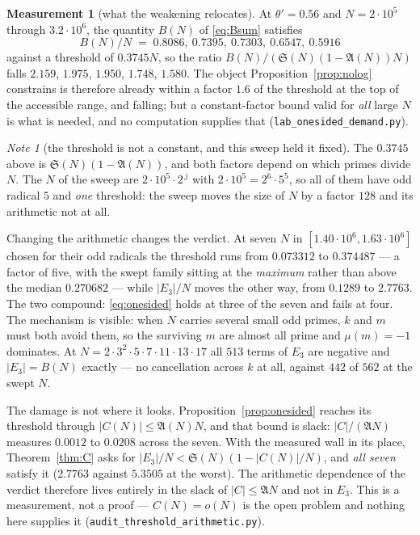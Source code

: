 \documentclass[11pt,a4paper]{article}
\theoremstyle{plain}
\theoremstyle{definition}
\newtheorem{measurement}[theorem]{Measurement}
\theoremstyle{remark}
\newtheorem{note}[theorem]{Note}
\renewcommand{\SS}{\mathfrak{S}}
\newcommand{\AAA}{\mathfrak{A}}
\begin{document}
\begin{measurement}[what the weakening relocates]\label{meas:relocate}
At $\theta'=0.56$ and $N=2\cdot10^5$ through $3.2\cdot10^6$, the
quantity $B(N)$ of \eqref{eq:Bsum} satisfies
\[
  B(N)/N\;=\;0.8086,\ 0.7395,\ 0.7303,\ 0.6547,\ 0.5916
\]
against a threshold of $0.3745N$, so the ratio
$B(N)/(\SS(N)(1-\AAA(N))N)$ falls
$2.159$, $1.975$, $1.950$, $1.748$, $1.580$. The object
Proposition~\ref{prop:nolog} constrains is therefore already within a
factor $1.6$ of the threshold at the top of the accessible range, and
falling; but a constant-factor bound valid for \emph{all} large $N$ is
what is needed, and no computation supplies that
(\texttt{lab\_onesided\_demand.py}).
\end{measurement}

\begin{note}[the threshold is not a constant, and this sweep held it
fixed]\label{note:threshfam}
The $0.3745$ above is $\SS(N)(1-\AAA(N))$, and both factors depend on
which primes divide $N$. The $N$ of the sweep are
$2\cdot10^5\cdot2^{\,j}$ with $2\cdot10^5=2^6\cdot5^5$, so all of them
have odd radical $5$ and \emph{one} threshold: the sweep moves the size
of $N$ by a factor $128$ and its arithmetic not at all.

Changing the arithmetic changes the verdict. At seven $N$ in
$[1.40\cdot10^6,1.63\cdot10^6]$ chosen for their odd radicals the
threshold runs from $0.073312$ to $0.374487$ --- a factor of five, with
the swept family sitting at the \emph{maximum} rather than above the
median $0.270682$ --- while $|E_3|/N$ moves the other way, from
$0.1289$ to $2.7763$. The two compound: \eqref{eq:onesided} holds at
three of the seven and fails at four. The mechanism is visible: when
$N$ carries several small odd primes, $k$ and $m$ must both avoid them,
so the surviving $m$ are almost all prime and $\mu(m)=-1$ dominates. At
$N=2\cdot3^2\cdot5\cdot7\cdot11\cdot13\cdot17$ all $513$ terms of $E_3$
are negative and $|E_3|=B(N)$ exactly --- no cancellation across $k$ at
all, against $442$ of $562$ at the swept $N$.

The damage is not where it looks. Proposition~\ref{prop:onesided}
reaches its threshold through $|C(N)|\le\AAA(N)N$, and that bound is
slack: $|C|/(\AAA N)$ measures $0.0012$ to $0.0208$ across the seven.
With the measured wall in its place, Theorem~\ref{thm:C} asks for
$|E_3|/N<\SS(N)(1-|C(N)|/N)$, and \emph{all seven} satisfy it
($2.7763$ against $5.3505$ at the worst). The arithmetic dependence of
the verdict therefore lives entirely in the slack of $|C|\le\AAA N$
and not in $E_3$. This is a measurement, not a proof --- $C(N)=o(N)$ is
the open problem and nothing here supplies it
(\texttt{audit\_threshold\_arithmetic.py}).
\end{note}
\end{document}
